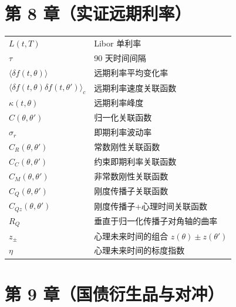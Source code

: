 \section*{第 8 章（实证远期利率）}

\begin{center}
\begin{tabular}{@{}L{3.2cm}L{10.6cm}@{}}
\toprule
$L(t,T)$ & Libor 单利率 \\
$\tau$ & 90 天时间间隔 \\
$\langle\delta f(t,\theta)\rangle$ & 远期利率平均变化率 \\
$\langle\delta f(t,\theta)\delta f(t,\theta')\rangle_c$ & 远期利率速度关联函数 \\
$\kappa(t,\theta)$ & 远期利率峰度 \\
$C(\theta,\theta')$ & 归一化关联函数 \\
$\sigma_r$ & 即期利率波动率 \\
$C_R(\theta,\theta')$ & 常数刚性关联函数 \\
$C_C(\theta,\theta')$ & 约束即期利率关联函数 \\
$C_M(\theta,\theta')$ & 非常数刚性关联函数 \\
$C_Q(\theta,\theta')$ & 刚度传播子关联函数 \\
$C_{Qz}(\theta,\theta')$ & 刚度传播子+心理时间关联函数 \\
$R_Q$ & 垂直于归一化传播子对角轴的曲率 \\
$z_{\pm}$ & 心理未来时间的组合 $z(\theta)\pm z(\theta')$ \\
$\eta$ & 心理未来时间的标度指数 \\
\bottomrule
\end{tabular}
\end{center}

\section*{第 9 章（国债衍生品与对冲）}

